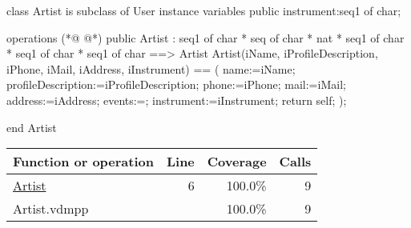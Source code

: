 \begin{vdmpp}[breaklines=true]
class Artist is subclass of User 
instance variables
  public instrument:seq1 of char;

operations
(*@
\label{Artist:6}
@*)
  public  Artist : seq1 of char * seq of char * nat * seq1 of char * seq1 of char * seq1 of char ==> Artist
  Artist(iName, iProfileDescription, iPhone, iMail, iAddress, iInstrument) == (
   name:=iName;
   profileDescription:=iProfileDescription;
   phone:=iPhone;
   mail:=iMail;
   address:=iAddress;
   events:={};
   instrument:=iInstrument;
   return self;
  );
  
end Artist
\end{vdmpp}
\bigskip
\begin{longtable}{|l|r|r|r|}
\hline
Function or operation & Line & Coverage & Calls \\
\hline
\hline
\hyperref[Artist:6]{Artist} & 6&100.0\% & 9 \\
\hline
\hline
Artist.vdmpp & & 100.0\% & 9 \\
\hline
\end{longtable}

